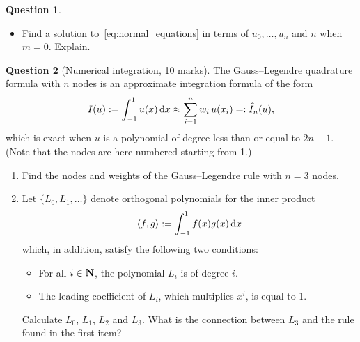 \documentclass[11pt]{article}
\theoremstyle{definition}
\newtheorem{question}{Question}
\begin{document}
\begin{question}
\begin{enumerate}
\begin{itemize}

            \item
                \mymark
                Find a solution to~\eqref{eq:normal_equations} in terms of $u_0, \dotsc, u_n$ and $n$ when $m = 0$.
                Explain.
        \end{itemize}
\end{enumerate}
\end{question}

\newpage
\begin{question}
    [Numerical integration, 10 marks]
    The Gauss--Legendre quadrature formula with $n$ nodes is an approximate integration formula of the form
    \begin{equation}
        \label{gauss_legendre}
        I(u) := \int_{-1}^{1} u(x) \, \mathrm d x \approx \sum_{i=1}^{n} w_i \, u(x_i) =: \widehat I_n(u),
    \end{equation}
    which is exact when $u$ is a polynomial of degree less than or equal to $2n-1$.
    (Note that the nodes are here numbered starting from 1.)

    \begin{enumerate}
        \item
            Find the nodes and weights of the Gauss--Legendre rule with $n=3$ nodes.

        \item
            Let $\{L_0, L_1, \dotsc\}$ denote orthogonal polynomials for the inner product
            \[
                \langle f, g\rangle := \int_{-1}^{1} f(x) g(x) \, \mathrm d x
            \]
            which, in addition, satisfy the following two conditions:
            \begin{itemize}
                \item
                    For all $i \in \mathbf N$,
                    the polynomial $L_i$ is of degree $i$.

                \item
                    The leading coefficient of $L_i$,
                    which multiplies $x^i$,
                    is equal to 1.
            \end{itemize}
            Calculate $L_0$, $L_1$, $L_2$ and $L_3$.
            What is the connection between $L_3$ and the rule found in the first item?


\end{enumerate}
\end{question}
\end{document}
